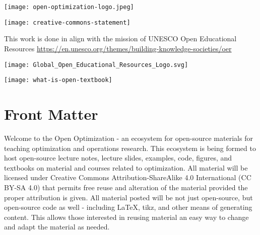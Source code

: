 \documentclass[../open-optimization/open-optimization.tex]{subfiles}
\begin{document}


\begin{center}
\texttt{[image: open-optimization-logo.jpeg]}
\end{center}
\newpage

\texttt{[image: creative-commons-statement]}


This work is done in align with the mission of UNESCO Open Educational Resources \url{https://en.unesco.org/themes/building-knowledge-societies/oer}
\begin{center}
\texttt{[image: Global\_Open\_Educational\_Resources\_Logo.svg]}\footnotemark
\end{center}

\newpage

\texttt{[image: what-is-open-textbook]}\footnotemark
{}

\newpage


\maketitle

\section*{Front Matter}


Welcome to the Open Optimization - an ecosystem for open-source materials for teaching optimization and operations research.  This ecosystem is being formed to host open-source lecture notes, lecture slides, examples, code, figures, and textbooks on material and courses related to optimization.  All material will be licensed under Creative Commons Attribution-ShareAlike 4.0 International (CC BY-SA 4.0) that permits free reuse and alteration of the material provided the proper attribution is given.  All material posted will be not just open-source, but open-source code as well - including LaTeX, tikz, and other means of generating content.  This allows those interested in reusing material an easy way to change and adapt the material as needed.
\end{document}
